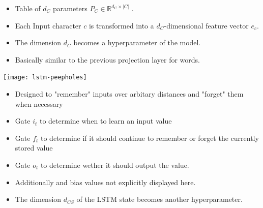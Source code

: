 \documentclass[11pt, a4paper, landscape]{article}
\begin{document}
\vfill
\begin{itemize}
  \item Table of $d_C$ parameters $P_C \in \mathbb{R}^{d_C \times |C|}$ .
  \item Each Input character $c$ is transformed into a $d_C$-dimensional feature vector $e_{c}$.

  \item The dimension $d_C$ becomes a hyperparameter of the model.
  \item Basically similar to the previous projection layer for words.
\end{itemize}
\vfill



\NewPage{}


\begin{minipage}[c]{.5\linewidth}
  \begin{center}
   \texttt{[image: lstm-peepholes]}
  \end{center}
\end{minipage}
\begin{minipage}[c]{.5\linewidth}
  \begin{itemize}
\item Designed to "remember" inputs over arbitary distances and "forget" them when necessary
\item Gate \(i_t\) to determine when to learn an input value
\item Gate \(f_t\) to determine if it should continue to remember or forget the currently stored value
\item Gate \(o_t\) to determine wether it should output the value.
\item Additionally and bias values not explicitly displayed here.
\item The dimension $d_{CS}$ of the LSTM state becomes another hyperparameter.
\end{itemize}
\end{minipage}




\NewPage{}
\end{document}
